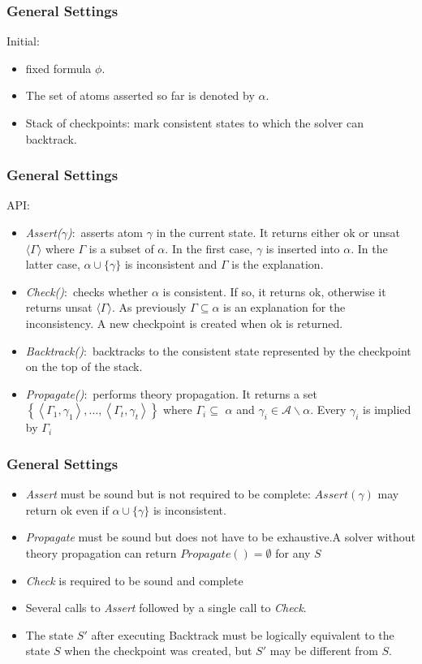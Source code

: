 \documentclass[aspectratio=169%
,serif,mathserif]{beamer}
\begin{document}
\begin{frame}
	\frametitle{General Settings}		

		Initial:
			\begin{itemize}
				\item fixed formula $\phi$.
				\item The set of atoms asserted so far is denoted by $\alpha$.
				\item Stack of checkpoints: mark consistent states to which the solver can backtrack.
			\end{itemize}

\end{frame}


\begin{frame}
	\frametitle{General Settings}	
	API:
	\begin{itemize}
		\item \emph{Assert($\gamma$)}:~asserts atom $\gamma$ in the current state. It returns either ok or unsat $\langle\Gamma\rangle$ where $\Gamma$ is a subset of $\alpha$. In the first case, $\gamma$ is inserted into $\alpha$. In the latter case, $\alpha \cup\{\gamma\}$ is inconsistent and $\Gamma$ is the explanation.
		\item \emph{Check()}:~checks whether $\alpha$ is consistent. If so, it returns ok, otherwise it returns unsat $\langle\Gamma\rangle$. As previously $\Gamma \subseteq \alpha$ is an explanation for the inconsistency. A new checkpoint is created when ok is returned.
		\item \emph{Backtrack()}:~backtracks to the consistent state represented by the checkpoint on the top of the stack.
		\item \emph{Propagate()}:~performs theory propagation. It returns a set $\left\{\left\langle\Gamma_{1}, \gamma_{1}\right\rangle, \ldots,\left\langle\Gamma_{t}, \gamma_{t}\right\rangle\right\}$ where $\Gamma_{i} \subseteq$ $\alpha$ and $\gamma_{i} \in \mathcal{A} \backslash \alpha$. Every $\gamma_{i}$ is implied by $\Gamma_{i}$
	\end{itemize}
\end{frame}

\begin{frame}
	\frametitle{General Settings}	
	\begin{itemize}
		\item \emph{Assert} must be sound but is not required to be complete: $Assert(\gamma)$ may return ok even if $\alpha \cup \{\gamma\}$ is inconsistent.
		\item \emph{Propagate} must be sound but does not have to be exhaustive.A solver without theory propagation can return $Propagate()=\emptyset$ for any $S$
		\item \emph{Check} is required to be sound and complete
		\item Several calls to \emph{Assert} followed by a single call to \emph{Check}.
		\item The state $S'$ after executing Backtrack must be logically equivalent
		to the state $S$ when the checkpoint was created, but $S'$ may be different from $S$.
	\end{itemize}
\end{frame}
\end{document}

